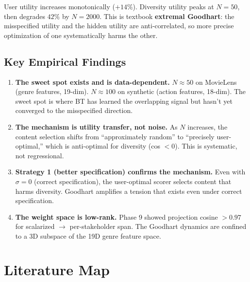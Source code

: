 \documentclass[11pt]{article}
\begin{document}
User utility increases monotonically ($+14\%$). Diversity utility peaks
at $N=50$, then degrades $42\%$ by $N=2000$. This is textbook
\textbf{extremal Goodhart}: the misspecified utility and the hidden
utility are anti-correlated, so more precise optimization of one
systematically harms the other.

\subsection{Key Empirical Findings}

\begin{enumerate}
  \item \textbf{The sweet spot exists and is data-dependent.}
    $N \approx 50$ on MovieLens (genre features, 19-dim).
    $N \approx 100$ on synthetic (action features, 18-dim).
    The sweet spot is where BT has learned the overlapping signal
    but hasn't yet converged to the misspecified direction.

  \item \textbf{The mechanism is utility transfer, not noise.}
    As $N$ increases, the content selection shifts from
    ``approximately random'' to ``precisely user-optimal,'' which is
    anti-optimal for diversity (cos $< 0$). This is systematic, not
    regressional.

  \item \textbf{Strategy 1 (better specification) confirms the
    mechanism.} Even with $\sigma = 0$ (correct specification), the
    user-optimal scorer selects content that harms diversity. Goodhart
    amplifies a tension that exists even under correct specification.

  \item \textbf{The weight space is low-rank.} Phase 9 showed projection
    cosine $> 0.97$ for scalarized $\to$ per-stakeholder span. The
    Goodhart dynamics are confined to a 3D subspace of the 19D genre
    feature space.
\end{enumerate}

\section{Literature Map}
\end{document}
